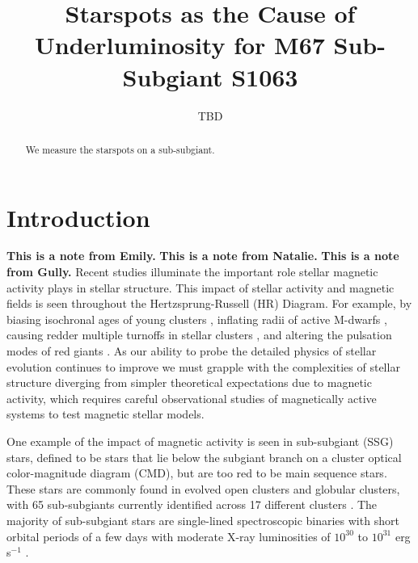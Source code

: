 \documentclass[modern,trackchanges]{aastex631}
\newcommand\natalienote[1]{\textbf{{\color{orange}#1}}}
\newcommand\gullynote[1]{\textbf{{\color{magenta}#1}}}
\newcommand\emilynote[1]{\textbf{{\color{cyan}#1}}}
\begin{document}

\title{Starspots as the Cause of Underluminosity for M67 Sub-Subgiant S1063 }

\author{TBD}


\begin{abstract}

We measure the starspots on a sub-subgiant.

\end{abstract}



\section{Introduction}\label{sec:intro}
\emilynote{This is a note from Emily.}
\natalienote{This is a note from Natalie.}
\gullynote{This is a note from Gully.}
Recent studies illuminate the important role stellar magnetic activity plays in stellar structure. This impact of stellar activity and magnetic fields is seen throughout the Hertzsprung-Russell (HR) Diagram. For example, by biasing isochronal ages of young clusters \citep{somers15}, inflating radii of active M-dwarfs \citep{2010AJ....140.1158T,2010ApJ...718..502M,2019MNRAS.483.1125J}, causing redder multiple turnoffs in stellar clusters \citep{2009MNRAS.398L..11B,2019ApJ...876..113S}, and altering the pulsation modes of red giants \citep{2020A&A...639A..63G}. As our ability to probe the detailed physics of stellar evolution continues to improve we must grapple with the complexities of stellar structure diverging from simpler theoretical expectations due to magnetic activity, which requires careful observational studies of magnetically active systems to test magnetic stellar models.

One example of the impact of magnetic activity is seen in sub-subgiant (SSG) stars, defined to be stars that lie below the subgiant branch on a cluster optical color-magnitude diagram (CMD), but are too red to be main sequence stars. These stars are commonly found in evolved open clusters and globular clusters, with 65 sub-subgiants currently identified across 17 different clusters \citep{geller17}. The majority of sub-subgiant stars are single-lined spectroscopic binaries with short orbital periods of a few days with moderate X-ray luminosities of $10^{30}$ to $10^{31}$ erg s$^{-1}$ \citep[and references therein]{geller17}.
\end{document}
